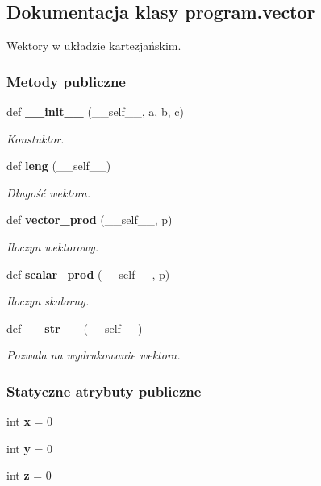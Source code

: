 \subsection{Dokumentacja klasy program.\+vector}
\label{classprogram_1_1vector}


Wektory w układzie kartezjańskim.  


\subsubsection*{Metody publiczne}
\begin{DoxyCompactItemize}
\item 
def \textbf{ \+\_\+\+\_\+init\+\_\+\+\_\+} (\+\_\+\+\_\+self\+\_\+\+\_\+, a, b, c)
\begin{DoxyCompactList}\small\item\em Konstuktor. \end{DoxyCompactList}\item 
def \textbf{ leng} (\+\_\+\+\_\+self\+\_\+\+\_\+)
\begin{DoxyCompactList}\small\item\em Długość wektora. \end{DoxyCompactList}\item 
def \textbf{ vector\+\_\+prod} (\+\_\+\+\_\+self\+\_\+\+\_\+, p)
\begin{DoxyCompactList}\small\item\em Iloczyn wektorowy. \end{DoxyCompactList}\item 
def \textbf{ scalar\+\_\+prod} (\+\_\+\+\_\+self\+\_\+\+\_\+, p)
\begin{DoxyCompactList}\small\item\em Iloczyn skalarny. \end{DoxyCompactList}\item 
def \textbf{ \+\_\+\+\_\+str\+\_\+\+\_\+} (\+\_\+\+\_\+self\+\_\+\+\_\+)
\begin{DoxyCompactList}\small\item\em Pozwala na wydrukowanie wektora. \end{DoxyCompactList}\end{DoxyCompactItemize}
\subsubsection*{Statyczne atrybuty publiczne}
\begin{DoxyCompactItemize}
\item 
int \textbf{ x} = 0
\item 
int \textbf{ y} = 0
\item 
int \textbf{ z} = 0
\end{DoxyCompactItemize}


